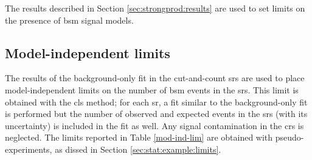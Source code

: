 The results described in Section \ref{sec:strongprod:results} are used to set limits on the presence of \gls{bsm} 
signal models. 

\subsection{Model-independent limits}
\label{sec:strong:modelindepUL}

The results of the background-only fit in the cut-and-count \glspl{sr}
are used to place model-independent limits on the number of \gls{bsm} events in the \glspl{sr}. 
This limit is obtained with the \gls{cls} method; for each \gls{sr}, a fit similar to the background-only fit is performed 
but the number of observed and expected events in the \glspl{sr} (with its uncertainty) is included in the fit as well. 
Any signal contamination in the \glspl{cr} is neglected. 
The limits reported in Table \ref{mod-ind-lim} are obtained with pseudo-experiments, as dissed in Section \ref{sec:stat:example:limits}.

